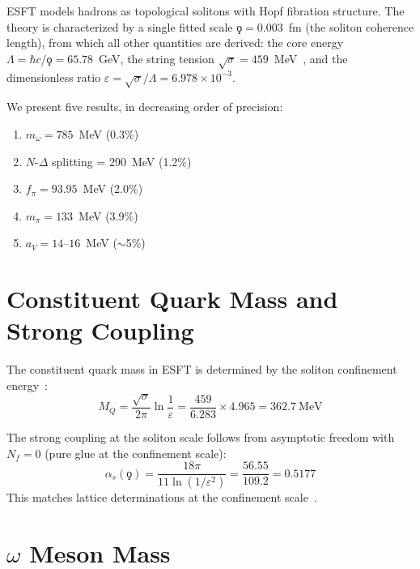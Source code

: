 ﻿\documentclass[twocolumn,showpacs,preprintnumbers,amsmath,amssymb,prc]{revtex4-2}
\begin{document}
ESFT models hadrons as topological solitons with Hopf fibration structure. The theory is characterized by a single fitted scale $\koppa = 0.003$~fm (the soliton coherence length), from which all other quantities are derived: the core energy $\Lambda = \hbar c/\koppa = 65.78$~GeV, the string tension $\sqrt{\sigma} = 459$~MeV~\cite{Paper2}, and the dimensionless ratio $\varepsilon = \sqrt{\sigma}/\Lambda = 6.978 \times 10^{-3}$.

We present five results, in decreasing order of precision:
\begin{enumerate}
\item $m_\omega = 785$~MeV (0.3\%)
\item $N$-$\Delta$ splitting = 290~MeV (1.2\%)
\item $f_\pi = 93.95$~MeV (2.0\%)
\item $m_\pi = 133$~MeV (3.9\%)
\item $a_V = 14$--$16$~MeV ($\sim$5\%)
\end{enumerate}

\section{Constituent Quark Mass and Strong Coupling}
\label{sec:mq}

The constituent quark mass in ESFT is determined by the soliton confinement energy~\cite{Paper3}:
\begin{equation}
M_Q = \frac{\sqrt{\sigma}}{2\pi}\ln\frac{1}{\varepsilon} = \frac{459}{6.283} \times 4.965 = 362.7~\text{MeV}
\label{eq:MQ}
\end{equation}

The strong coupling at the soliton scale follows from asymptotic freedom with $N_f = 0$ (pure glue at the confinement scale):
\begin{equation}
\alpha_s(\koppa) = \frac{18\pi}{11\ln(1/\varepsilon^2)} = \frac{56.55}{109.2} = 0.5177
\label{eq:alphas}
\end{equation}
This matches lattice determinations at the confinement scale~\cite{Bali2000}.

\section{$\omega$ Meson Mass}
\label{sec:omega}
\end{document}
